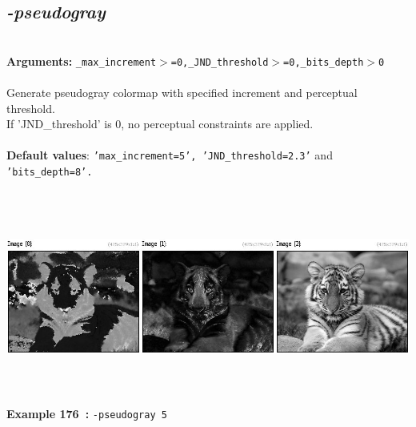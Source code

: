 \documentclass[a4paper,11pt,twoside]{book}
\begin{document}
\subsection{\emph{-pseudogray} }\vspace*{-0.5em}
~\\\textbf{Arguments: } 
{\small \texttt{\_max\_increment$>$=0,\_JND\_threshold$>$=0,\_bits\_depth$>$0}}\\~\\
Generate pseudogray colormap with specified increment and perceptual threshold.
~\\If 'JND\_threshold' is 0, no perceptual constraints are applied.
~\\~\\\textbf{Default values}: {\small \texttt{'max\_increment=5', 'JND\_threshold=2.3'} and \texttt{'bits\_depth=8'.}}
\begin{center}\includegraphics[keepaspectratio=true,height=7cm,width=\textwidth]{img/gmic_def176.jpg}\\
{\footnotesize \textbf{Example 176~:} \texttt{-pseudogray 5}}
\end{center}
\end{document}
